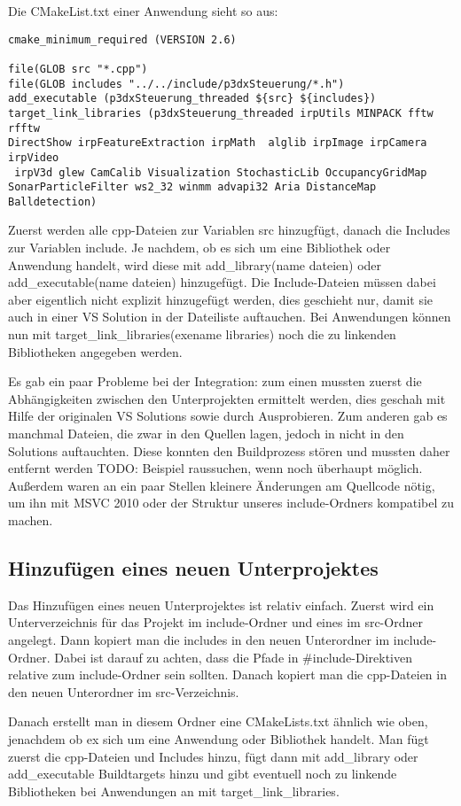 Die CMakeList.txt einer Anwendung sieht so aus:
\begin{lstlisting}[captionpos=b,caption={CMakeLists.txt des Clients}]
cmake_minimum_required (VERSION 2.6)

file(GLOB src "*.cpp")
file(GLOB includes "../../include/p3dxSteuerung/*.h")
add_executable (p3dxSteuerung_threaded ${src} ${includes})
target_link_libraries (p3dxSteuerung_threaded irpUtils MINPACK fftw rfftw
DirectShow irpFeatureExtraction irpMath  alglib irpImage irpCamera irpVideo
 irpV3d glew CamCalib Visualization StochasticLib OccupancyGridMap
SonarParticleFilter ws2_32 winmm advapi32 Aria DistanceMap Balldetection)

\end{lstlisting}

Zuerst werden alle cpp-Dateien zur Variablen src hinzugfügt, danach die
Includes zur Variablen include. Je nachdem, ob es sich um eine Bibliothek
oder
Anwendung handelt, wird diese mit add\_library(name dateien) oder
add\_executable(name dateien) hinzugefügt. Die Include-Dateien müssen dabei
aber eigentlich nicht explizit hinzugefügt werden, dies geschieht nur,
damit
sie auch in einer VS Solution in der Dateiliste auftauchen. Bei Anwendungen
können nun mit target\_link\_libraries(exename libraries) noch die zu
linkenden
Bibliotheken angegeben werden.

Es gab ein paar Probleme bei der Integration: zum einen mussten zuerst die
Abhängigkeiten zwischen den Unterprojekten ermittelt werden, dies geschah
mit
Hilfe der originalen VS Solutions sowie durch Ausprobieren. Zum anderen gab
 es
manchmal Dateien, die zwar in den Quellen lagen, jedoch in nicht in den
Solutions auftauchten. Diese konnten den Buildprozess stören und mussten
daher
entfernt werden TODO: Beispiel raussuchen, wenn noch überhaupt möglich.
Außerdem waren an ein paar Stellen kleinere Änderungen am Quellcode nötig,
um
ihn mit MSVC 2010 oder der Struktur unseres include-Ordners kompatibel zu
machen.

\subsection{Hinzufügen eines neuen Unterprojektes}
\label{sec:hinz-eines-neuen-unterprojektes}
Das Hinzufügen eines neuen Unterprojektes ist relativ einfach.
Zuerst wird ein Unterverzeichnis für das Projekt im include-Ordner und
eines im
src-Ordner angelegt. Dann kopiert man die includes in den neuen Unterordner
 im
include-Ordner. Dabei ist darauf zu achten, dass die Pfade in
\#include-Direktiven relative zum include-Ordner sein sollten. Danach
kopiert
man die cpp-Dateien in den neuen Unterordner im src-Verzeichnis.

Danach erstellt man in diesem Ordner eine CMakeLists.txt ähnlich wie oben,
jenachdem ob ex sich um eine Anwendung oder Bibliothek handelt. Man fügt
zuerst
die cpp-Dateien und Includes hinzu, fügt dann mit add\_library oder
add\_executable Buildtargets hinzu und gibt eventuell noch zu linkende
Bibliotheken bei Anwendungen an mit target\_link\_libraries.

